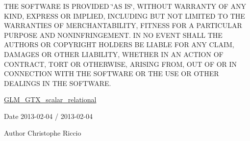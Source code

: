 T\-H\-E S\-O\-F\-T\-W\-A\-R\-E I\-S P\-R\-O\-V\-I\-D\-E\-D \char`\"{}\-A\-S I\-S\char`\"{}, W\-I\-T\-H\-O\-U\-T W\-A\-R\-R\-A\-N\-T\-Y O\-F A\-N\-Y K\-I\-N\-D, E\-X\-P\-R\-E\-S\-S O\-R I\-M\-P\-L\-I\-E\-D, I\-N\-C\-L\-U\-D\-I\-N\-G B\-U\-T N\-O\-T L\-I\-M\-I\-T\-E\-D T\-O T\-H\-E W\-A\-R\-R\-A\-N\-T\-I\-E\-S O\-F M\-E\-R\-C\-H\-A\-N\-T\-A\-B\-I\-L\-I\-T\-Y, F\-I\-T\-N\-E\-S\-S F\-O\-R A P\-A\-R\-T\-I\-C\-U\-L\-A\-R P\-U\-R\-P\-O\-S\-E A\-N\-D N\-O\-N\-I\-N\-F\-R\-I\-N\-G\-E\-M\-E\-N\-T. I\-N N\-O E\-V\-E\-N\-T S\-H\-A\-L\-L T\-H\-E A\-U\-T\-H\-O\-R\-S O\-R C\-O\-P\-Y\-R\-I\-G\-H\-T H\-O\-L\-D\-E\-R\-S B\-E L\-I\-A\-B\-L\-E F\-O\-R A\-N\-Y C\-L\-A\-I\-M, D\-A\-M\-A\-G\-E\-S O\-R O\-T\-H\-E\-R L\-I\-A\-B\-I\-L\-I\-T\-Y, W\-H\-E\-T\-H\-E\-R I\-N A\-N A\-C\-T\-I\-O\-N O\-F C\-O\-N\-T\-R\-A\-C\-T, T\-O\-R\-T O\-R O\-T\-H\-E\-R\-W\-I\-S\-E, A\-R\-I\-S\-I\-N\-G F\-R\-O\-M, O\-U\-T O\-F O\-R I\-N C\-O\-N\-N\-E\-C\-T\-I\-O\-N W\-I\-T\-H T\-H\-E S\-O\-F\-T\-W\-A\-R\-E O\-R T\-H\-E U\-S\-E O\-R O\-T\-H\-E\-R D\-E\-A\-L\-I\-N\-G\-S I\-N T\-H\-E S\-O\-F\-T\-W\-A\-R\-E.

\hyperlink{group__gtx__scalar__relational}{G\-L\-M\-\_\-\-G\-T\-X\-\_\-scalar\-\_\-relational}

\begin{DoxyDate}{Date}
2013-\/02-\/04 / 2013-\/02-\/04 
\end{DoxyDate}
\begin{DoxyAuthor}{Author}
Christophe Riccio 
\end{DoxyAuthor}
